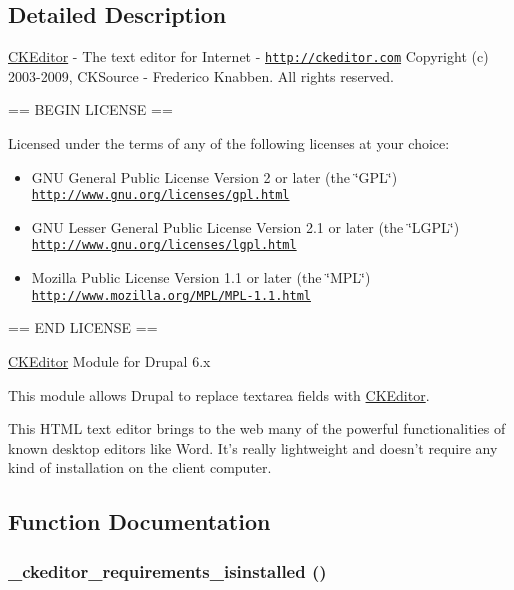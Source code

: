 \subsection{Detailed Description}
\hyperlink{classCKEditor}{CKEditor} - The text editor for Internet - \href{http://ckeditor.com}{\tt http://ckeditor.com} Copyright (c) 2003-2009, CKSource - Frederico Knabben. All rights reserved.

== BEGIN LICENSE ==

Licensed under the terms of any of the following licenses at your choice:

\begin{itemize}
\item GNU General Public License Version 2 or later (the \char`\"{}GPL\char`\"{}) \href{http://www.gnu.org/licenses/gpl.html}{\tt http://www.gnu.org/licenses/gpl.html}\end{itemize}


\begin{itemize}
\item GNU Lesser General Public License Version 2.1 or later (the \char`\"{}LGPL\char`\"{}) \href{http://www.gnu.org/licenses/lgpl.html}{\tt http://www.gnu.org/licenses/lgpl.html}\end{itemize}


\begin{itemize}
\item Mozilla Public License Version 1.1 or later (the \char`\"{}MPL\char`\"{}) \href{http://www.mozilla.org/MPL/MPL-1.1.html}{\tt http://www.mozilla.org/MPL/MPL-1.1.html}\end{itemize}


== END LICENSE ==

\hyperlink{classCKEditor}{CKEditor} Module for Drupal 6.x

This module allows Drupal to replace textarea fields with \hyperlink{classCKEditor}{CKEditor}.

This HTML text editor brings to the web many of the powerful functionalities of known desktop editors like Word. It's really lightweight and doesn't require any kind of installation on the client computer. 

\subsection{Function Documentation}
\hypertarget{ckeditor_8lib_8inc_cdfac606bf0b63be4bbdd3e0fd985eda}{
\subsubsection[{\_\-ckeditor\_\-requirements\_\-isinstalled}]{\setlength{\rightskip}{0pt plus 5cm}\_\-ckeditor\_\-requirements\_\-isinstalled ()}}
\label{ckeditor_8lib_8inc_cdfac606bf0b63be4bbdd3e0fd985eda}


